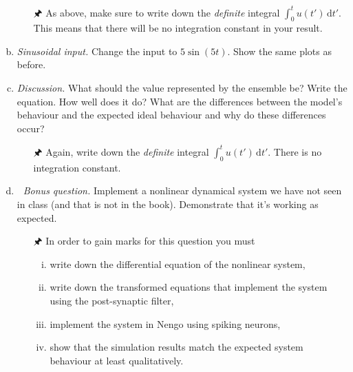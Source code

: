\begin{enumerate}[a)]
		\begin{itemize}
			\item[{\symbolfont 🖈}] As above, make sure to write down the \emph{definite} integral $\int_0^t u(t') \,\mathrm{d}t'$. This means that there will be no integration constant in your result.
		\end{itemize}
		\item {} \emph{Sinusoidal input.} Change the input to $5\sin(5t)$. Show the same plots as before.
		\item {} \emph{Discussion.} What should the value represented by the ensemble be? Write the equation. How well does it do? What are the differences between the model's behaviour and the expected ideal behaviour and why do these differences occur?
		\begin{itemize}
			\item[{\symbolfont 🖈}] Again, write down the \emph{definite} integral $\int_0^t u(t') \,\mathrm{d}t'$. There is no integration constant.
\end{itemize}
		\item {} \textit{{\symbolfont 🌟} Bonus question.} Implement a nonlinear dynamical system we have not seen in class (and that is not in the book). Demonstrate that it's working as expected.
		\begin{itemize}
			\item[{\symbolfont 🖈}] In order to gain marks for this question you must
			\begin{enumerate}[(i)]
				\item write down the differential equation of the nonlinear system,
				\item write down the transformed equations that implement the system using the post-synaptic filter,
				\item implement the system in Nengo using spiking neurons,
				\item show that the simulation results match the expected system behaviour at least qualitatively.
			\end{enumerate}
		\end{itemize}
	\end{enumerate}


